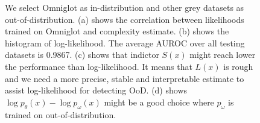 \documentclass[letterpaper]{article} %
\begin{document}
\begin{figure}[t]
\centering
{}
\caption{We select Omniglot as in-distribution and other grey datasets as out-of-distribution. (a) shows the correlation between likelihoods trained on Omniglot and complexity estimate. (b) shows the histogram of log-likelihood. The average AUROC over all testing datasets is 0.9867. (c) shows that indictor $S(x)$ might reach lower the performance than log-likelihood. It means that $L(x)$ is rough and we need a more precise, stable and interpretable estimate to assist log-likelihood for detecting OoD. (d) shows $\log p_\theta(x) - \log p_\omega(x)$ might be a good choice where $p_\omega$ is trained on out-of-distribution.%
}
\label{fig2}
\end{figure}
\end{document}
